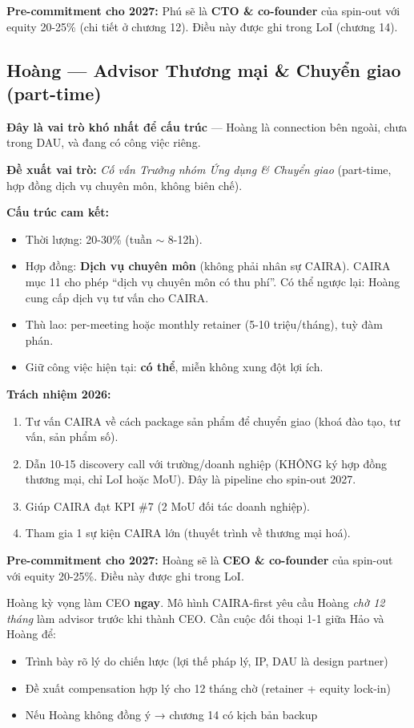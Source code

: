 \documentclass[11pt,a4paper]{article}
\begin{document}
\textbf{Pre-commitment cho 2027:} Phú sẽ là \textbf{CTO \& co-founder} của spin-out với equity 20-25\% (chi tiết ở chương 12). Điều này được ghi trong LoI (chương 14).

\subsection{Hoàng — Advisor Thương mại \& Chuyển giao (part-time)}

\textbf{Đây là vai trò khó nhất để cấu trúc} — Hoàng là connection bên ngoài, chưa trong DAU, và đang có công việc riêng.

\textbf{Đề xuất vai trò:} \textit{Cố vấn Trưởng nhóm Ứng dụng \& Chuyển giao} (part-time, hợp đồng dịch vụ chuyên môn, không biên chế).

\textbf{Cấu trúc cam kết:}
\begin{itemize}
\item Thời lượng: 20-30\% (tuần $\sim$ 8-12h).
\item Hợp đồng: \textbf{Dịch vụ chuyên môn} (không phải nhân sự CAIRA). CAIRA mục 11 cho phép ``dịch vụ chuyên môn có thu phí''. Có thể ngược lại: Hoàng cung cấp dịch vụ tư vấn cho CAIRA.
\item Thù lao: per-meeting hoặc monthly retainer (5-10 triệu/tháng), tuỳ đàm phán.
\item Giữ công việc hiện tại: \textbf{có thể}, miễn không xung đột lợi ích.
\end{itemize}

\textbf{Trách nhiệm 2026:}
\begin{enumerate}
\item Tư vấn CAIRA về cách package sản phẩm để chuyển giao (khoá đào tạo, tư vấn, sản phẩm số).
\item Dẫn 10-15 discovery call với trường/doanh nghiệp (KHÔNG ký hợp đồng thương mại, chỉ LoI hoặc MoU). Đây là pipeline cho spin-out 2027.
\item Giúp CAIRA đạt KPI \#7 (2 MoU đối tác doanh nghiệp).
\item Tham gia 1 sự kiện CAIRA lớn (thuyết trình về thương mại hoá).
\end{enumerate}

\textbf{Pre-commitment cho 2027:} Hoàng sẽ là \textbf{CEO \& co-founder} của spin-out với equity 20-25\%. Điều này được ghi trong LoI.

\begin{warnbox}[title=Vấn đề phải đối thoại thẳng với Hoàng]
Hoàng kỳ vọng làm CEO \textbf{ngay}. Mô hình CAIRA-first yêu cầu Hoàng \textit{chờ 12
tháng} làm advisor trước khi thành CEO. Cần cuộc đối thoại 1-1 giữa Hảo và Hoàng
để:
\begin{itemize}
\item Trình bày rõ lý do chiến lược (lợi thế pháp lý, IP, DAU là design partner)
\item Đề xuất compensation hợp lý cho 12 tháng chờ (retainer + equity lock-in)
\item Nếu Hoàng không đồng ý → chương 14 có kịch bản backup
\end{itemize}
\end{warnbox}
\end{document}
